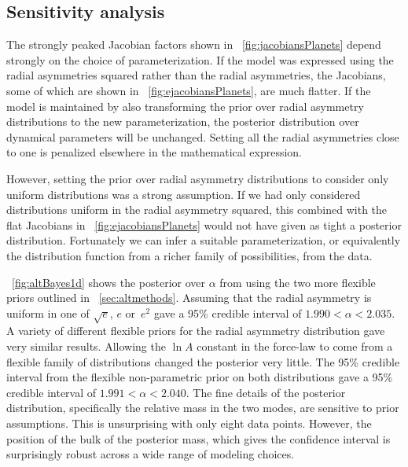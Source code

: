 \subsection{Sensitivity analysis}\label{sec:sensitivity}

The strongly peaked Jacobian factors shown in
\figurename~\ref{fig:jacobiansPlanets} depend strongly on the choice
of parameterization. If the model was expressed using the radial
asymmetries squared rather than the radial asymmetries, the Jacobians,
some of which are shown in \figurename~\ref{fig:ejacobiansPlanets},
are much flatter. If the model is maintained by also transforming the
prior over radial asymmetry distributions to the new parameterization,
the posterior distribution over dynamical parameters will be
unchanged. Setting all the radial asymmetries close to one is
penalized elsewhere in the mathematical expression.

However, setting the prior over radial asymmetry distributions to
consider only uniform distributions was a strong assumption. If we had
only considered distributions uniform in the radial asymmetry squared,
this combined with the flat Jacobians in
\figurename~\ref{fig:ejacobiansPlanets} would not have given as tight
a posterior distribution. Fortunately we can infer a suitable
parameterization, or equivalently the distribution function from a
richer family of possibilities, from the data.

\figurename~\ref{fig:altBayes1d} shows the posterior over $\alpha$
from using the two more flexible priors outlined in
\sectionname~\ref{sec:altmethods}. Assuming that the radial asymmetry is
uniform in one of $\sqrt{e}$, $e$ or~$e^2$ gave a 95\% credible
interval of $1.990 < \alpha < 2.035$. A variety of different flexible
priors for the radial asymmetry distribution gave very similar
results.  Allowing the $\ln A$ constant in the force-law to come from
a flexible family of distributions changed the posterior very
little. The 95\% credible interval from the flexible non-parametric
prior on both distributions gave a 95\% credible interval of $1.991 <
\alpha < 2.040$. The fine details of the posterior distribution,
specifically the relative mass in the two modes, are sensitive to
prior assumptions. This is unsurprising with only eight data
points. However, the position of the bulk of the posterior mass, which
gives the confidence interval is surprisingly robust across a wide
range of modeling choices.

